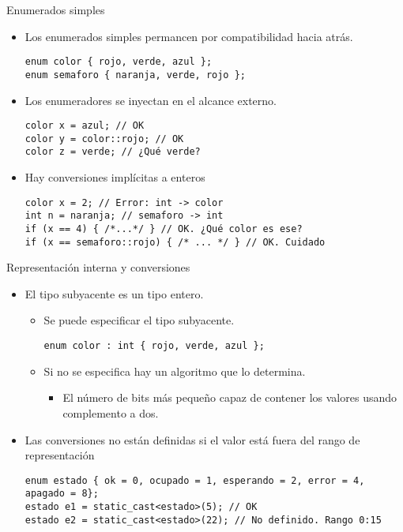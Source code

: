 \begin{frame}[t,fragile]{Enumerados simples}
\begin{itemize}
  \item Los enumerados simples permancen por compatibilidad hacia atrás.
\begin{lstlisting}
enum color { rojo, verde, azul };
enum semaforo { naranja, verde, rojo };
\end{lstlisting}

  \item Los enumeradores se inyectan en el alcance externo.
\begin{lstlisting}
color x = azul; // OK
color y = color::rojo; // OK
color z = verde; // ¿Qué verde?
\end{lstlisting}

  \item Hay conversiones implícitas a enteros
\begin{lstlisting}
color x = 2; // Error: int -> color
int n = naranja; // semaforo -> int
if (x == 4) { /*...*/ } // OK. ¿Qué color es ese?
if (x == semaforo::rojo) { /* ... */ } // OK. Cuidado
\end{lstlisting}
\end{itemize}
\end{frame}

\begin{frame}[t,fragile]{Representación interna y conversiones}
\begin{itemize}
  \item El tipo subyacente es un tipo entero.
    \begin{itemize}
      \item Se puede especificar el tipo subyacente.
\begin{lstlisting}
enum color : int { rojo, verde, azul };
\end{lstlisting}
      \item Si no se especifica hay un algoritmo que lo determina.
        \begin{itemize}
          \item El número de bits más pequeño capaz de contener los valores usando
                complemento a dos.
        \end{itemize}
    \end{itemize}

  \item Las conversiones no están definidas si el valor está fuera del rango de representación
\begin{lstlisting}
enum estado { ok = 0, ocupado = 1, esperando = 2, error = 4, apagado = 8};
estado e1 = static_cast<estado>(5); // OK
estado e2 = static_cast<estado>(22); // No definido. Rango 0:15
\end{lstlisting}
\end{itemize}
\end{frame}
